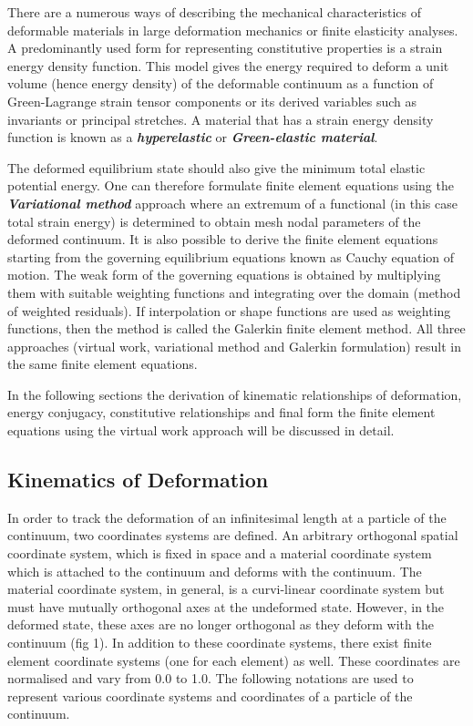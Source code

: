 There are a numerous ways of describing the mechanical characteristics of
deformable materials in large deformation mechanics or finite elasticity
analyses. A predominantly used form for representing constitutive properties
is a strain energy density function. This model gives the energy required to
deform a unit volume (hence energy density) of the deformable continuum as a
function of Green-Lagrange strain tensor components or its derived variables
such as invariants or principal stretches. A material that has a strain energy
density function is known as a \textit{\textbf{hyperelastic}} or
\textit{\textbf{Green-elastic material}}.

The deformed equilibrium state should also give the minimum total elastic
potential energy. One can therefore formulate finite element equations using
the \textit{\textbf{Variational method}} approach where an extremum of a
functional (in this case total strain energy) is determined to obtain mesh
nodal parameters of the deformed continuum. It is also possible to derive the
finite element equations starting from the governing equilibrium equations
known as Cauchy equation of motion. The weak form of the governing equations
is obtained by multiplying them with suitable weighting functions and
integrating over the domain (method of weighted residuals). If interpolation
or shape functions are used as weighting functions, then the method is called
the Galerkin finite element method. All three approaches (virtual work,
variational method and Galerkin formulation) result in the same finite element
equations.

In the following sections the derivation of kinematic relationships of
deformation, energy conjugacy, constitutive relationships and final form the
finite element equations using the virtual work approach will be discussed in
detail.

\subsection{Kinematics of Deformation}
In order to track the deformation of an infinitesimal length at a particle of
the continuum, two coordinates systems are defined. An arbitrary orthogonal
spatial coordinate system, which is fixed in space and a material coordinate
system which is attached to the continuum and deforms with the continuum. The
material coordinate system, in general, is a curvi-linear coordinate system
but must have mutually orthogonal axes at the undeformed state. However, in
the deformed state, these axes are no longer orthogonal as they deform with
the continuum (fig 1). In addition to these coordinate systems, there exist
finite element coordinate systems (one for each element) as well. These
coordinates are normalised and vary from 0.0 to 1.0. The following notations are used to represent various coordinate systems and coordinates of a particle of the continuum.\\

